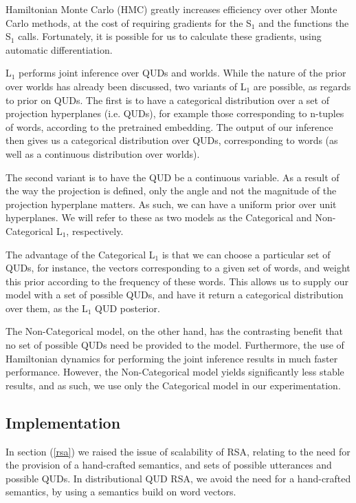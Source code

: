 \documentclass[10pt,letterpaper,twocolumn]{article}
\begin{document}
Hamiltonian Monte Carlo (HMC) greatly increases efficiency over other Monte Carlo methods, at the cost of requiring gradients for the S$_1$ and the functions the S$_1$ calls. Fortunately, it is possible for us to calculate these gradients, using automatic differentiation.

L$_1$ performs joint inference over QUDs and worlds. While the nature of the prior over worlds has already been discussed, two variants of L$_1$ are possible, as regards to prior on QUDs. The first is to have a categorical distribution over a set of projection hyperplanes (i.e. QUDs), for example those corresponding to n-tuples of words, according to the pretrained embedding. The output of our inference then gives us a categorical distribution over QUDs, corresponding to words (as well as a continuous distribution over worlds). 

The second variant is to have the QUD be a continuous variable. As a result of the way the projection is defined, only the angle and not the magnitude of the projection hyperplane matters. As such, we can have a uniform prior over unit hyperplanes. We will refer to these as two models as the Categorical and Non-Categorical L$_1$, respectively.

The advantage of the Categorical L$_1$ is that we can choose a particular set of QUDs, for instance, the vectors corresponding to a given set of words, and weight this prior according to the frequency of these words. This allows us to supply our model with a set of possible QUDs, and have it return a categorical distribution over them, as the L$_1$ QUD posterior.

The Non-Categorical model, on the other hand, has the contrasting benefit that no set of possible QUDs need be provided to the model. Furthermore, the use of Hamiltonian dynamics for performing the joint inference results in much faster performance. However, the Non-Categorical model yields significantly less stable results, and as such, we use only the Categorical model in our experimentation.




\subsection{Implementation} \label{implementation}

In section (\ref{rsa}) we raised the issue of scalability of RSA, relating to the need for the provision of a hand-crafted semantics, and sets of possible utterances and possible QUDs. In distributional QUD RSA, we avoid the need for a hand-crafted semantics, by using a semantics build on word vectors.
\end{document}
